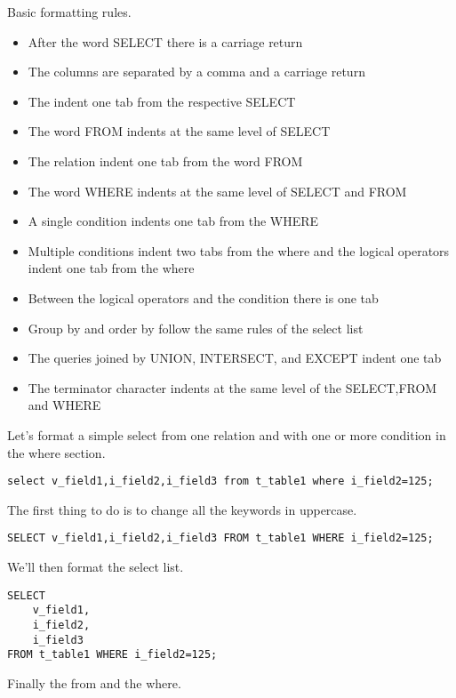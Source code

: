 Basic formatting rules.
\begin{itemize}
 \item After the word SELECT there is a carriage return
 \item The columns are separated by a comma and a carriage return
 \item The indent one tab from the respective SELECT
 \item The word FROM indents at the same level of SELECT 
 \item The relation indent one tab from the word FROM
 \item The word WHERE indents at the same level of SELECT and FROM
 \item A single condition indents one tab from the WHERE 
 \item Multiple conditions indent two tabs from the where and the logical operators indent one tab from the where
 \item Between the logical operators and the condition there is one tab
 \item Group by and order by follow the same rules of the select list
 \item The queries joined by UNION, INTERSECT, and EXCEPT indent one tab 
 \item The terminator character indents at the same level of the SELECT,FROM and WHERE
\end{itemize}

Let's format a simple select from one relation and with one or more condition in the where section.

\begin{lstlisting}[style=pgsql]
 select v_field1,i_field2,i_field3 from t_table1 where i_field2=125;
\end{lstlisting}

The first thing to do is to change all the keywords in uppercase.

\begin{lstlisting}[style=pgsql]
 SELECT v_field1,i_field2,i_field3 FROM t_table1 WHERE i_field2=125;
\end{lstlisting}

We'll then format the select list.

\begin{lstlisting}[style=pgsql]
SELECT 
	v_field1,
	i_field2,
	i_field3 
FROM t_table1 WHERE i_field2=125;
\end{lstlisting}

Finally the from and the where.

